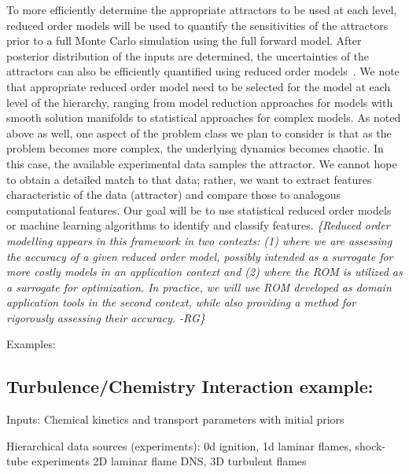 \documentclass[11pt]{article}
\newcommand{\remrg}[1]{ {\it \color{drkgrn} \{#1 -RG\}}}
\begin{document}
To more efficiently determine the appropriate attractors to be used at each level, reduced order models will be used to quantify the sensitivities of the attractors prior to a full Monte Carlo simulation using the full forward model.  After posterior distribution of the inputs are determined, the uncertainties of the attractors can also be efficiently quantified using reduced order models~\cite{Marrel:2009cp,Pau:2013vq}.  We note that appropriate reduced order model need to be selected for the model at each level of the hierarchy, ranging from model reduction approaches for models with smooth solution manifolds to statistical approaches for complex models.  As noted above as well, one aspect of the problem class we plan to consider is that as the problem becomes more
complex, the underlying dynamics becomes chaotic.  In this case, the available experimental data
 samples the attractor.  We cannot hope to obtain a detailed match to that data; rather, we want
to extract features characteristic of the data (attractor) and compare those to analogous computational
features.  Our goal will be to use statistical reduced order models or machine learning algorithms to identify and classify
features. \remrg{Reduced order modelling appears in
  this framework in two contexts: (1) where we are assessing the
  accuracy of a given reduced order model, possibly intended as a
  surrogate for more costly models in an application context and (2)
  where the ROM is utilized as a surrogate for optimization. In
  practice, we will use ROM developed as domain application tools in
  the second context, while also providing a method for rigorously
  assessing their accuracy.}




Examples:

\subsection*{Turbulence/Chemistry Interaction example:}

Inputs: Chemical kinetics and transport parameters with initial priors
 
Hierarchical data sources (experiments): 0d ignition, 1d laminar flames, shock-tube experiments
2D laminar flame DNS, 3D turbulent flames
\end{document}
